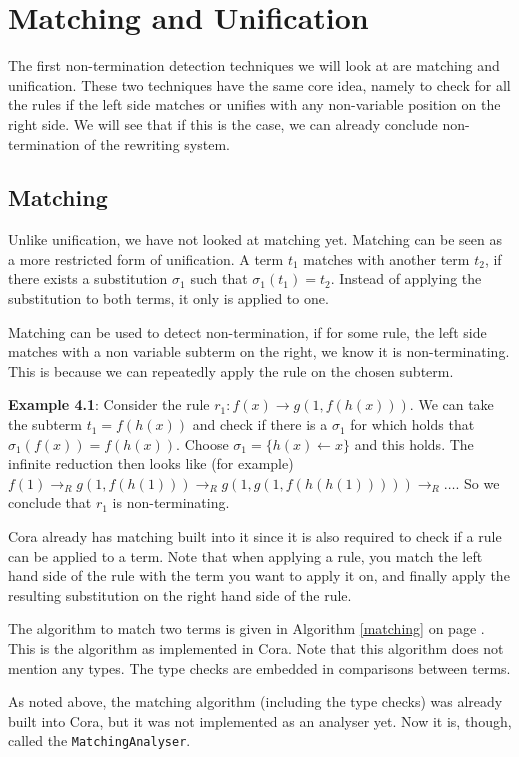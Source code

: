 \chapter{Matching and Unification}\label{matching-unification}
The first non-termination detection techniques we will look at are matching and unification. These two techniques have the same core idea, namely to check for all the rules if the left side matches or unifies with any non-variable position on the right side. We will see that if this is the case, we can already conclude non-termination of the rewriting system.

\section{Matching}
Unlike unification, we have not looked at matching yet. Matching can be seen as a more restricted form of unification. A term $t_1$ matches with another term $t_2$, if there exists a substitution $\sigma_1$ such that $\sigma_1(t_1) = t_2$. Instead of applying the substitution to both terms, it only is applied to one.

Matching can be used to detect non-termination, if for some rule, the left side matches with a non variable subterm on the right, we know it is non-terminating. This is because we can repeatedly apply the rule on the chosen subterm.

\textbf{Example 4.1}: Consider the rule $r_1: f(x) \rightarrow g(1, f(h(x)))$. We can take the subterm $t_1 = f(h(x))$ and check if there is a $\sigma_1$ for which holds that $\sigma_1(f(x)) = f(h(x))$. Choose $\sigma_1 = \{ h(x) \leftarrow x \}$ and this holds. The infinite reduction then looks like (for example) $f(1) \rightarrow_R g(1, f(h(1))) \rightarrow_R g(1, g(1, f(h(h(1))))) \rightarrow_R \dots$. So we conclude that $r_1$ is non-terminating. 

Cora already has matching built into it since it is also required to check if a rule can be applied to a term. Note that when applying a rule, you match the left hand side of the rule with the term you want to apply it on, and finally apply the resulting substitution on the right hand side of the rule.

The algorithm to match two terms is given in Algorithm \ref{matching} on page \pageref{matching}. This is the algorithm as implemented in Cora. Note that this algorithm does not mention any types. The type checks are embedded in comparisons between terms. 

As noted above, the matching algorithm (including the type checks) was already built into Cora, but it was not implemented as an analyser yet. Now it is, though, called the \texttt{MatchingAnalyser}. 

